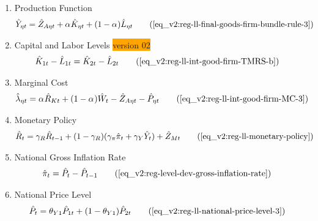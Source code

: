\documentclass[../thesis.tex]{subfiles}
\begin{document}
{\begin{itemize}
\begin{enumerate}
		\item Production Function
		\begin{align}
			\hat{Y}_{\eta t} &= \hat{Z}_{A\eta t} + {\alpha_{}} \hat{K}_{\eta t} + (1-{\alpha_{}}) \hat{L}_{\eta t} \tag{\ref{eq_v2:reg-ll-final-goods-firm-bundle-rule-3}}
		\end{align}

		\item Capital and Labor Levels \colorbox{orange}{version 02}
		\begin{align}
			\hat{K}_{1t} - \hat{L}_{1t} &= \hat{K}_{2t} - \hat{L}_{2t} \tag{\ref{eq_v2:reg-ll-int-good-firm-TMRS-b}}
		\end{align}		
		
		
		\begin{comment}

		\item Marginal Rates of Substitution of Factors
		\begin{align}
			\hat{K}_{\eta t} - \hat{L}_{\eta t} &= \hat{W}_{t} - \hat{R}_{K t} \tag{\ref{eq_v2:reg-ll-int-good-firm-TMRS}}
		\end{align}
			
		\end{comment}
		
		
		\item Marginal Cost
		\begin{alignat}{2}
			\hat{\lambda}_{\eta t} &= {\alpha_{}} \hat{R}_{Kt} + (1- {\alpha_{}}) \hat{W}_{t} - \hat{Z}_{A\eta t} - \hat{P}_{\eta t} \tag{\ref{eq_v2:reg-ll-int-good-firm-MC-3}}
		\end{alignat}
		
		\item Monetary Policy
		\begin{align}
			& \hat{R}_t = \gamma_R \hat{R}_{t-1} + (1-\gamma_R)(\gamma_\pi \hat{\pi}_t + \gamma_Y \hat{Y}_t) + \hat{Z}_{Mt} \tag{\ref{eq_v2:reg-ll-monetary-policy}}
		\end{align}
		
		\item National Gross Inflation Rate
		\begin{align}
			\hat{\pi}_{t} &= \hat{P}_{t} - \hat{P}_{t-1} \tag{\ref{eq_v2:reg-level-dev-gross-inflation-rate}}
		\end{align}
		
		\item National Price Level
		\begin{alignat}{2}
			\hat{P}_{t} &= \theta_{Y1} \hat{P}_{1t} + (1-\theta_{Y1}) \hat{P}_{2t} \tag{\ref{eq_v2:reg-ll-national-price-level-3}}
		\end{alignat}
		

\end{enumerate}
\end{itemize}}
\end{document}
